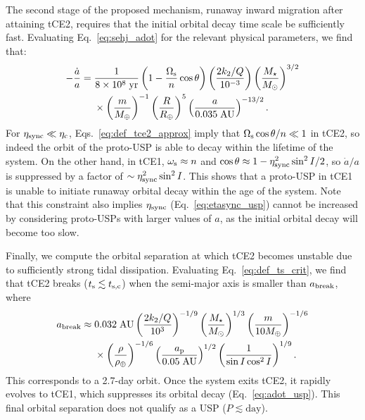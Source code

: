 \documentclass[
        fleqn,
        usenatbib,
    ]{mnras}
\newcommand*{\p}[1]{\left(#1\right)}
\begin{document}
The second stage of the proposed mechanism, runaway inward migration after
attaining tCE2, requires that the initial orbital decay time scale be
sufficiently fast. Evaluating Eq.~\eqref{eq:sehj_adot} for the relevant physical
parameters, we find that:
\begin{align}
    -\frac{\dot{a}}{a} ={}& \frac{1}{8 \times 10^8\;\mathrm{yr}}
            \p{1 - \frac{\Omega_{\rm s}}{n}\cos \theta}
            \p{\frac{2k_2/Q}{10^{-3}}}
            \p{\frac{M_\star}{M_{\odot}}}^{3/2}\nonumber\\
        &\times \p{\frac{m}{M_{\oplus}}}^{-1}
            \p{\frac{R}{R_{\oplus}}}^5
            \p{\frac{a}{0.035\;\mathrm{AU}}}^{-13/2}.
            \label{eq:adot_usp}
\end{align}
For $\eta_{\rm sync} \ll \eta_{\rm c}$, Eqs.~\eqref{eq:def_tce2_approx} imply
that $\Omega_{\rm s}\cos \theta / n \ll 1$ in tCE2, so indeed the orbit of the
proto-USP is able to decay within the lifetime of the system. On the other hand,
in tCE1, $\omega_{\rm s} \approx n$ and $\cos \theta \approx 1 - \eta_{\rm
sync}^2 \sin^2 I / 2$, so $\dot{a} / a$ is suppressed by a factor of $\sim
\eta_{\rm sync}^2 \sin^2 I$. This shows that a proto-USP in tCE1 is unable to
initiate runaway orbital decay within the age of the system. Note that this
constraint also implies $\eta_{\rm sync}$ (Eq.~\ref{eq:etasync_usp}) cannot be
increased by considering proto-USPs with larger values of $a$, as the initial
orbital decay will become too slow.

Finally, we compute the orbital separation at which tCE2 becomes unstable due to
sufficiently strong tidal dissipation. Evaluating Eq.~\eqref{eq:def_ts_crit}, we
find that tCE2 breaks ($t_{\rm s} \lesssim t_{\rm s, c}$) when the semi-major
axis is smaller than $a_{\rm break}$, where
\begin{align}
    a_{\rm break} \approx{}& 0.032 \;\mathrm{AU}
        \p{\frac{2k_2/Q}{10^{3}}}^{-1/9}
        \p{\frac{M_\star}{M_{\odot}}}^{1/3}
        \p{\frac{m}{10M_{\oplus}}}^{-1/6}\nonumber\\
        &\times \p{\frac{\rho}{\rho_{\oplus}}}^{-1/6}
        \p{\frac{a_{\rm p}}{0.05\;\mathrm{AU}}}^{1/2}
        \p{\frac{1}{\sin I \cos^2 I}}^{1/9}.
\end{align}
This corresponds to a 2.7-day orbit. Once the system exits tCE2, it rapidly
evolves to tCE1, which suppresses its orbital decay (Eq.~\ref{eq:adot_usp}).
This final orbital separation does not qualify as a USP ($P \lesssim
\mathrm{day}$).
\end{document}
